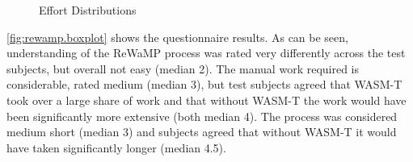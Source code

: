 \begin{figure}

\caption{Effort Distributions}

\label{fig:efforts}

\end{figure}

\cref{fig:rewamp.boxplot} shows the questionnaire results.
As can be seen, understanding of the ReWaMP process was rated very differently across the test subjects, but overall not easy (median 2).
The manual work required is considerable, rated medium (median 3), but test subjects agreed that WASM-T took over a large share of work and that without WASM-T the work would have been significantly more extensive (both median 4).
The process was considered medium short (median 3) and subjects agreed that without WASM-T it would have taken significantly longer (median 4.5).

